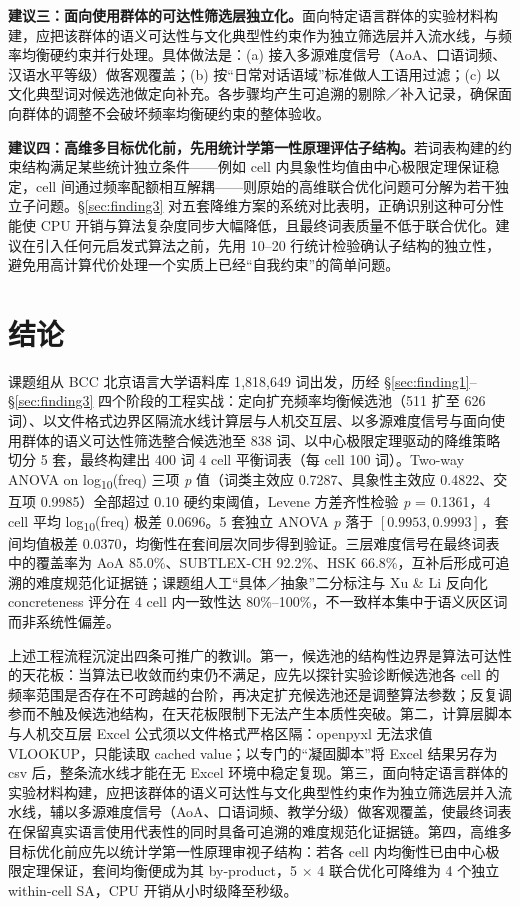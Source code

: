 \documentclass[12pt, a4paper]{article}
\begin{document}
\textbf{建议三：面向使用群体的可达性筛选层独立化。}面向特定语言群体的实验材料构建，应把该群体的语义可达性与文化典型性约束作为独立筛选层并入流水线，与频率均衡硬约束并行处理。具体做法是：(a) 接入多源难度信号（AoA、口语词频、汉语水平等级）做客观覆盖；(b) 按“日常对话语域”标准做人工语用过滤；(c) 以文化典型词对候选池做定向补充。各步骤均产生可追溯的剔除／补入记录，确保面向群体的调整不会破坏频率均衡硬约束的整体验收。

\textbf{建议四：高维多目标优化前，先用统计学第一性原理评估子结构。}若词表构建的约束结构满足某些统计独立条件——例如 cell 内具象性均值由中心极限定理保证稳定，cell 间通过频率配额相互解耦——则原始的高维联合优化问题可分解为若干独立子问题。\S\ref{sec:finding3} 对五套降维方案的系统对比表明，正确识别这种可分性能使 CPU 开销与算法复杂度同步大幅降低，且最终词表质量不低于联合优化。建议在引入任何元启发式算法之前，先用 10--20 行统计检验确认子结构的独立性，避免用高计算代价处理一个实质上已经“自我约束”的简单问题。

\section{结论}
\label{sec:conclusion}

课题组从 BCC 北京语言大学语料库 1{,}818{,}649 词出发，历经 \S\ref{sec:finding1}--\S\ref{sec:finding3} 四个阶段的工程实战：定向扩充频率均衡候选池（511 扩至 626 词）、以文件格式边界区隔流水线计算层与人机交互层、以多源难度信号与面向使用群体的语义可达性筛选整合候选池至 838 词、以中心极限定理驱动的降维策略切分 5 套，最终构建出 400 词 4 cell 平衡词表（每 cell 100 词）。Two-way ANOVA on log\textsubscript{10}(freq) 三项 \textit{p} 值（词类主效应 0.7287、具象性主效应 0.4822、交互项 0.9985）全部超过 0.10 硬约束阈值，Levene 方差齐性检验 \textit{p} = 0.1361，4 cell 平均 log\textsubscript{10}(freq) 极差 0.0696。5 套独立 ANOVA \textit{p} 落于 $[0.9953, 0.9993]$，套间均值极差 0.0370，均衡性在套间层次同步得到验证。三层难度信号在最终词表中的覆盖率为 AoA 85.0\%、SUBTLEX-CH 92.2\%、HSK 66.8\%，互补后形成可追溯的难度规范化证据链；课题组人工“具体／抽象”二分标注与 Xu \& Li 反向化 concreteness 评分在 4 cell 内一致性达 80\%--100\%，不一致样本集中于语义灰区词而非系统性偏差。

上述工程流程沉淀出四条可推广的教训。第一，候选池的结构性边界是算法可达性的天花板：当算法已收敛而约束仍不满足，应先以探针实验诊断候选池各 cell 的频率范围是否存在不可跨越的台阶，再决定扩充候选池还是调整算法参数；反复调参而不触及候选池结构，在天花板限制下无法产生本质性突破。第二，计算层脚本与人机交互层 Excel 公式须以文件格式严格区隔：openpyxl 无法求值 VLOOKUP，只能读取 cached value；以专门的“凝固脚本”将 Excel 结果另存为 csv 后，整条流水线才能在无 Excel 环境中稳定复现。第三，面向特定语言群体的实验材料构建，应把该群体的语义可达性与文化典型性约束作为独立筛选层并入流水线，辅以多源难度信号（AoA、口语词频、教学分级）做客观覆盖，使最终词表在保留真实语言使用代表性的同时具备可追溯的难度规范化证据链。第四，高维多目标优化前应先以统计学第一性原理审视子结构：若各 cell 内均衡性已由中心极限定理保证，套间均衡便成为其 by-product，5 $\times$ 4 联合优化可降维为 4 个独立 within-cell SA，CPU 开销从小时级降至秒级。
\end{document}
